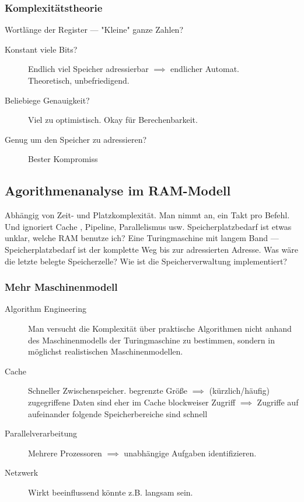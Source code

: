\documentclass[a4paper]{scrartcl}
\begin{document}
 	\subsubsection{Komplexitätstheorie}
 		Wortlänge der Register --- "Kleine" ganze Zahlen?
 		\begin{description}
 			\item[Konstant viele Bits?] 
 				Endlich viel Speicher adressierbar \( \implies \) endlicher Automat.\\
 				Theoretisch, unbefriedigend.
 			\item[Beliebiege Genauigkeit?] 
 				Viel zu optimistisch. Okay für Berechenbarkeit. 
 			\item[Genug um den Speicher zu adressieren?] 
 				Bester Kompromiss
 		\end{description}
 		\subsection{Agorithmenanalyse im RAM-Modell}
 			Abhängig von Zeit- und Platzkomplexität. Man nimmt an, ein Takt pro Befehl. Und ignoriert Cache , Pipeline, Parallelismus usw.
 			\reversemarginpar {}
 			Speicherplatzbedarf ist etwas unklar, welche RAM benutze ich? Eine Turingmaschine mit langem Band --- Speicherplatzbedarf ist der komplette Weg bis zur adressierten Adresse. Was wäre die letzte belegte Speicherzelle? Wie ist die Speicherverwaltung implementiert?
 			
 			\subsubsection{Mehr Maschinenmodell}
 				\begin{description}
 					\item[Algorithm Engineering] 
 						Man versucht die Komplexität über praktische Algorithmen nicht anhand des Maschinenmodells der Turingmaschine zu bestimmen, sondern in möglichst realistischen Maschinenmodellen.
 					\item[Cache] 
 						Schneller Zwischenspeicher.
 						\subitem begrenzte Größe \( \implies \) (kürzlich/häufig) zugegriffene Daten sind eher im Cache
 						\subitem blockweiser Zugriff \( \implies \) Zugriffe auf aufeinander folgende Speicherbereiche sind schnell 
 						\reversemarginpar {}
 					\item[Parallelverarbeitung] 
 						Mehrere Prozessoren \( \implies \) unabhängige Aufgaben identifizieren.
 					\item[Netzwerk] 
 						Wirkt beeinflussend könnte z.B. langsam sein.
 				\end{description}
 			
\end{document}
